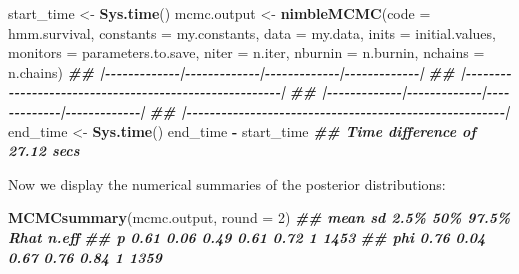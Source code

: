 \documentclass[
  12pt,
]{krantz}
\newenvironment{Shaded}{\begin{snugshade}}{\end{snugshade}}
\newcommand{\AttributeTok}[1]{\textcolor[rgb]{0.13,0.29,0.53}{#1}}
\newcommand{\DecValTok}[1]{\textcolor[rgb]{0.00,0.00,0.81}{#1}}
\newcommand{\DocumentationTok}[1]{\textcolor[rgb]{0.56,0.35,0.01}{\textbf{\textit{#1}}}}
\newcommand{\FunctionTok}[1]{\textcolor[rgb]{0.13,0.29,0.53}{\textbf{#1}}}
\newcommand{\NormalTok}[1]{#1}
\newcommand{\OtherTok}[1]{\textcolor[rgb]{0.56,0.35,0.01}{#1}}
\newcommand{\SpecialCharTok}[1]{\textcolor[rgb]{0.81,0.36,0.00}{\textbf{#1}}}
\begin{document}
\begin{Shaded}
\begin{Highlighting}[]
\NormalTok{start\_time }\OtherTok{\textless{}{-}} \FunctionTok{Sys.time}\NormalTok{()}
\NormalTok{mcmc.output }\OtherTok{\textless{}{-}} \FunctionTok{nimbleMCMC}\NormalTok{(}\AttributeTok{code =}\NormalTok{ hmm.survival,}
                          \AttributeTok{constants =}\NormalTok{ my.constants,}
                          \AttributeTok{data =}\NormalTok{ my.data,}
                          \AttributeTok{inits =}\NormalTok{ initial.values,}
                          \AttributeTok{monitors =}\NormalTok{ parameters.to.save,}
                          \AttributeTok{niter =}\NormalTok{ n.iter,}
                          \AttributeTok{nburnin =}\NormalTok{ n.burnin,}
                          \AttributeTok{nchains =}\NormalTok{ n.chains)}
\DocumentationTok{\#\# |{-}{-}{-}{-}{-}{-}{-}{-}{-}{-}{-}{-}{-}|{-}{-}{-}{-}{-}{-}{-}{-}{-}{-}{-}{-}{-}|{-}{-}{-}{-}{-}{-}{-}{-}{-}{-}{-}{-}{-}|{-}{-}{-}{-}{-}{-}{-}{-}{-}{-}{-}{-}{-}|}
\DocumentationTok{\#\# |{-}{-}{-}{-}{-}{-}{-}{-}{-}{-}{-}{-}{-}{-}{-}{-}{-}{-}{-}{-}{-}{-}{-}{-}{-}{-}{-}{-}{-}{-}{-}{-}{-}{-}{-}{-}{-}{-}{-}{-}{-}{-}{-}{-}{-}{-}{-}{-}{-}{-}{-}{-}{-}{-}{-}|}
\DocumentationTok{\#\# |{-}{-}{-}{-}{-}{-}{-}{-}{-}{-}{-}{-}{-}|{-}{-}{-}{-}{-}{-}{-}{-}{-}{-}{-}{-}{-}|{-}{-}{-}{-}{-}{-}{-}{-}{-}{-}{-}{-}{-}|{-}{-}{-}{-}{-}{-}{-}{-}{-}{-}{-}{-}{-}|}
\DocumentationTok{\#\# |{-}{-}{-}{-}{-}{-}{-}{-}{-}{-}{-}{-}{-}{-}{-}{-}{-}{-}{-}{-}{-}{-}{-}{-}{-}{-}{-}{-}{-}{-}{-}{-}{-}{-}{-}{-}{-}{-}{-}{-}{-}{-}{-}{-}{-}{-}{-}{-}{-}{-}{-}{-}{-}{-}{-}|}
\NormalTok{end\_time }\OtherTok{\textless{}{-}} \FunctionTok{Sys.time}\NormalTok{()}
\NormalTok{end\_time }\SpecialCharTok{{-}}\NormalTok{ start\_time}
\DocumentationTok{\#\# Time difference of 27.12 secs}
\end{Highlighting}
\end{Shaded}

Now we display the numerical summaries of the posterior distributions:

\begin{Shaded}
\begin{Highlighting}[]
\FunctionTok{MCMCsummary}\NormalTok{(mcmc.output, }\AttributeTok{round =} \DecValTok{2}\NormalTok{)}
\DocumentationTok{\#\#     mean   sd 2.5\%  50\% 97.5\% Rhat n.eff}
\DocumentationTok{\#\# p   0.61 0.06 0.49 0.61  0.72    1  1453}
\DocumentationTok{\#\# phi 0.76 0.04 0.67 0.76  0.84    1  1359}
\end{Highlighting}
\end{Shaded}
\end{document}
